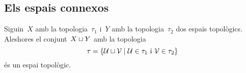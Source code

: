 \documentclass[../../main.tex]{subfiles}
\begin{document}
    \subsection{Els espais connexos}
    \begin{proposition}
        \label{prop:topologia-a-la-unio-disjunta}
        Siguin~\(X\) amb la topologia~\(\tau_{1}\) i~\(Y\) amb la topologia~\(\tau_{2}\) dos espais topològics.
        Aleshores el conjunt~\(X\mathbin{\sqcup} Y\) amb la topologia
        \begin{equation}
            \label{prop:topologia-a-la-unio-disjunta:eq1}
            \tau=\{\mathcal{U}\mathbin{\sqcup}\mathcal{V}\mid\mathcal{U}\in\tau_{1}\text{ i }\mathcal{V}\in\tau_{2}\}
        \end{equation}
        és un espai topològic.
    \end{proposition}
\end{document}
